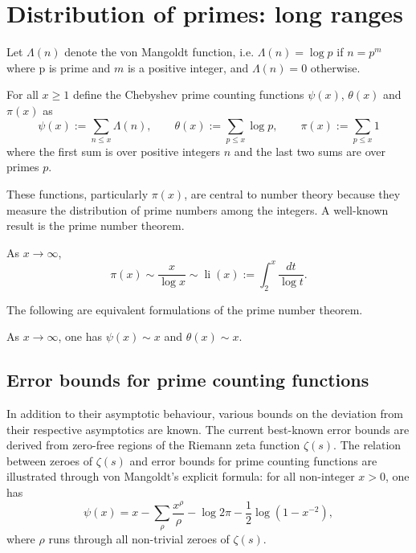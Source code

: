 \chapter{Distribution of primes: long ranges}
\label{chap:prime_counting_function}

Let $\Lambda(n)$ denote the von Mangoldt function, i.e. $\Lambda(n) = \log p$ if $n = p^m$ where p is prime and $m$ is a positive integer, and $\Lambda(n) = 0$ otherwise. 

\begin{definition}
For all $x \ge 1$ define the Chebyshev prime counting functions $\psi(x)$, $\theta(x)$ and $\pi(x)$ as
\[
\psi(x) := \sum_{n \le x}\Lambda(n),\qquad \theta(x) := \sum_{p \le x}\log p,\qquad \pi(x) := \sum_{p \le x}1
\]
where the first sum is over positive integers $n$ and the last two sums are over primes $p$.
\end{definition}

These functions, particularly $\pi(x)$, are central to number theory because they measure the distribution of prime numbers among the integers. A well-known result is the prime number theorem.

\begin{theorem}
As $x \to \infty$, 
\[
\pi(x) \sim \frac{x}{\log x} \sim \operatorname{li}(x) := \int_2^{x}\frac{dt}{\log t}.
\]
\end{theorem}

The following are equivalent formulations of the prime number theorem.

\begin{theorem}
As $x \to \infty$, one has $\psi(x) \sim x$ and $\theta(x) \sim x$.
\end{theorem}

\section{Error bounds for prime counting functions}
In addition to their asymptotic behaviour, various bounds on the deviation from their respective asymptotics are known. The current best-known error bounds are derived from zero-free regions of the Riemann zeta function $\zeta(s)$. The relation between zeroes of $\zeta(s)$ and error bounds for prime counting functions are illustrated through von Mangoldt's explicit formula: for all non-integer $x > 0$, one has
\[
\psi(x) = x - \sum_{\rho}\frac{x^\rho}{\rho} - \log 2\pi - \frac{1}{2}\log(1 - x^{-2}),
\]
where $\rho$ runs through all non-trivial zeroes of $\zeta(s)$.

